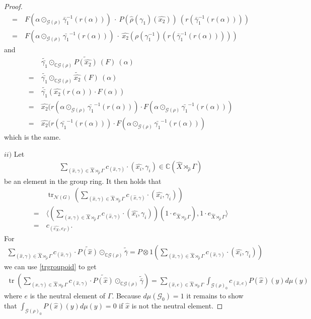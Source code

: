 \documentclass[12pt,a4paper]{scrartcl}
\theoremstyle{plain}
\theoremstyle{definition}
\numberwithin{equation}{section}
\newcommand{\C}{\mathbb{C}} %
\newcommand{\2}{\mathbb{Z} / 2 \mathbb{Z}}
\newcommand{\G}{\mathcal{G}}
\newcommand{\1}{\bar{1}}
\newcommand{\0}{\bar{0}}
\newcommand{\tr}{\operatorname{tr}}
\begin{document}
\begin{proof}
\begin{align*}
		=&~F(\alpha \odot_{\G (\rho)} \bar \gamma_1^{-1}(r(\alpha))) ~\cdot~ P(\hat{\rho}(\gamma_1)(\hat{x_2}))~(r(\bar \gamma_1^{-1}(r(\alpha)))) \\
		=&~ F(\alpha \odot_{\G (\rho)} \bar{\gamma_1}^{-1}(r(\alpha))) ~\cdot~ \hat{x_2}(\rho (\gamma_1^{-1})( r(\bar \gamma_1^{-1}(r(\alpha)))))
	\end{align*}
	and
	\begin{align*}
		 &~ \widetilde{\bar{\gamma_1}} \odot_{\C\G(\rho)} \widetilde{P(\hat{x_2})} ~(F) ~(\alpha) \\
		=&~ \widetilde{\bar{\gamma_1}} \odot_{\C\G(\rho)} \tilde{\hat{x_2}}~(F)~(\alpha) \\
		=&~ \widetilde{\bar{\gamma_1}}(\hat{x_2}(r(\alpha)) \cdot F(\alpha)) \\
		=&~ \hat{x_2}(r(\alpha \odot_{\G (\rho)} \bar{\gamma_1}^{-1}(r(\alpha))) \cdot F(\alpha \odot_{\G (\rho)} \bar{\gamma_1}^{-1}(r(\alpha))) \\
		=&~ \hat{x_2}(r(\bar{\gamma_1}^{-1}(r(\alpha))) \cdot F(\alpha \odot_{\G (\rho)} \bar{\gamma_1}^{-1}(r(\alpha)))
	\end{align*}
	which is the same.
	
	$ii)$ Let 
	\begin{align*}
		\sum_{(\hat{x}, \gamma) \in \hat{X} \rtimes_{\hat{\rho}} \Gamma} c_{(\hat{x}, \gamma)} \cdot (\hat{x_i}, \gamma_i) \in \C(\hat{X} \rtimes_{\hat{\rho}} \Gamma)
	\end{align*}
	be an element in the group ring. It then holds that
	\begin{align*}
		 &~ \tr_{\mathcal{N}(G)}(\sum_{(\hat{x}, \gamma) \in \hat{X} \rtimes_{\hat{\rho}} \Gamma} c_{(\hat{x}, \gamma)} \cdot (\hat{x_i}, \gamma_i)) \\
		=&~ \langle (\sum_{(\hat{x}, \gamma) \in \hat{X} \rtimes_{\hat{\rho}} \Gamma} c_{(\hat{x}, \gamma)} \cdot (\hat{x_i}, \gamma_i))(1 \cdot e_{\hat{X} \rtimes_{\hat{\rho}} \Gamma}), 1 \cdot e_{\hat{X} \rtimes_{\hat{\rho}} \Gamma} \rangle \\
		=&~ c_{(\hat{e_X}, e_\Gamma)}.
	\end{align*}
	For 
	\begin{align*}
		\sum_{(\hat{x}, \gamma) \in \hat{X} \rtimes_{\hat{\rho}} \Gamma} c_{(\hat{x}, \gamma)} \cdot \widetilde{P(\hat{x})} \odot_{\C\G(\rho)} \widetilde{\bar{\gamma}} = P \otimes 1 (\sum_{(\hat{x}, \gamma) \in \hat{X} \rtimes_{\hat{\rho}} \Gamma} c_{(\hat{x}, \gamma)} \cdot (\hat{x_i}, \gamma_i))
	\end{align*}
	we can use \ref{trgroupoid} to get
	\begin{align*}
		\tr(\sum_{(\hat{x}, \gamma) \in \hat{X} \rtimes_{\hat{\rho}} \Gamma} c_{(\hat{x}, \gamma)} \cdot \widetilde{P(\hat{x})} \odot_{\C\G(\rho)} \widetilde{\bar{\gamma}}) = \sum_{(\hat{x}, e) \in \hat{X} \rtimes_{\hat{\rho}} \Gamma} \int_{\mathcal{G(\rho)}_0} c_{(\hat{x}, e)} P(\hat{x})(y) d\mu(y)
	\end{align*}
	where $e$ is the neutral element of $\Gamma$. Because $d \mu(\G_0) = 1$ it remains to show that $\int_{\G(\rho)_0} P(\hat{x})(y) d\mu(y) = 0$ if $\hat{x}$ is not the neutral element.
	

\end{proof}
\end{document}
